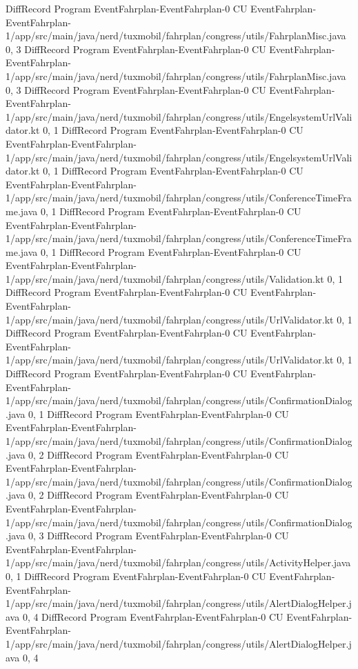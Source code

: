 DiffRecord Program EventFahrplan-EventFahrplan-0 CU EventFahrplan-EventFahrplan-1/app/src/main/java/nerd/tuxmobil/fahrplan/congress/utils/FahrplanMisc.java  {0, 3}
DiffRecord Program EventFahrplan-EventFahrplan-0 CU EventFahrplan-EventFahrplan-1/app/src/main/java/nerd/tuxmobil/fahrplan/congress/utils/FahrplanMisc.java  {0, 3}
DiffRecord Program EventFahrplan-EventFahrplan-0 CU EventFahrplan-EventFahrplan-1/app/src/main/java/nerd/tuxmobil/fahrplan/congress/utils/EngelsystemUrlValidator.kt  {0, 1}
DiffRecord Program EventFahrplan-EventFahrplan-0 CU EventFahrplan-EventFahrplan-1/app/src/main/java/nerd/tuxmobil/fahrplan/congress/utils/EngelsystemUrlValidator.kt  {0, 1}
DiffRecord Program EventFahrplan-EventFahrplan-0 CU EventFahrplan-EventFahrplan-1/app/src/main/java/nerd/tuxmobil/fahrplan/congress/utils/ConferenceTimeFrame.java  {0, 1}
DiffRecord Program EventFahrplan-EventFahrplan-0 CU EventFahrplan-EventFahrplan-1/app/src/main/java/nerd/tuxmobil/fahrplan/congress/utils/ConferenceTimeFrame.java  {0, 1}
DiffRecord Program EventFahrplan-EventFahrplan-0 CU EventFahrplan-EventFahrplan-1/app/src/main/java/nerd/tuxmobil/fahrplan/congress/utils/Validation.kt  {0, 1}
DiffRecord Program EventFahrplan-EventFahrplan-0 CU EventFahrplan-EventFahrplan-1/app/src/main/java/nerd/tuxmobil/fahrplan/congress/utils/UrlValidator.kt  {0, 1}
DiffRecord Program EventFahrplan-EventFahrplan-0 CU EventFahrplan-EventFahrplan-1/app/src/main/java/nerd/tuxmobil/fahrplan/congress/utils/UrlValidator.kt  {0, 1}
DiffRecord Program EventFahrplan-EventFahrplan-0 CU EventFahrplan-EventFahrplan-1/app/src/main/java/nerd/tuxmobil/fahrplan/congress/utils/ConfirmationDialog.java  {0, 1}
DiffRecord Program EventFahrplan-EventFahrplan-0 CU EventFahrplan-EventFahrplan-1/app/src/main/java/nerd/tuxmobil/fahrplan/congress/utils/ConfirmationDialog.java  {0, 2}
DiffRecord Program EventFahrplan-EventFahrplan-0 CU EventFahrplan-EventFahrplan-1/app/src/main/java/nerd/tuxmobil/fahrplan/congress/utils/ConfirmationDialog.java  {0, 2}
DiffRecord Program EventFahrplan-EventFahrplan-0 CU EventFahrplan-EventFahrplan-1/app/src/main/java/nerd/tuxmobil/fahrplan/congress/utils/ConfirmationDialog.java  {0, 3}
DiffRecord Program EventFahrplan-EventFahrplan-0 CU EventFahrplan-EventFahrplan-1/app/src/main/java/nerd/tuxmobil/fahrplan/congress/utils/ActivityHelper.java  {0, 1}
DiffRecord Program EventFahrplan-EventFahrplan-0 CU EventFahrplan-EventFahrplan-1/app/src/main/java/nerd/tuxmobil/fahrplan/congress/utils/AlertDialogHelper.java  {0, 4}
DiffRecord Program EventFahrplan-EventFahrplan-0 CU EventFahrplan-EventFahrplan-1/app/src/main/java/nerd/tuxmobil/fahrplan/congress/utils/AlertDialogHelper.java  {0, 4}
